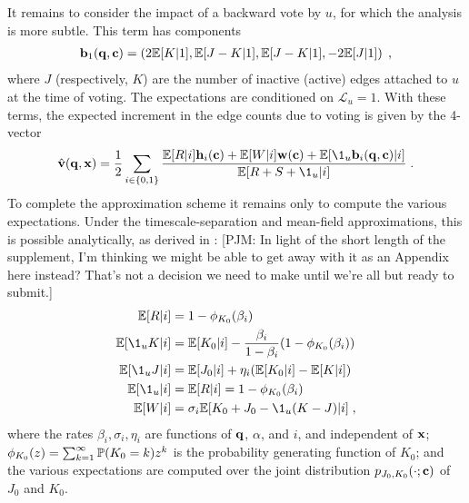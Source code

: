 \documentclass[review, onefignum, onetabnum]{siamart171218}
\newcommand{\pjm}[1]{{\color{blue}[PJM: #1]}}
\begin{document}
		It remains to consider the impact of a backward vote by $u$, for which the analysis is more subtle. 
		This term has components
		\begin{align}
			\mathbf{b}_1(\mathbf{q}, \mathbf{c}) = \left(2\mathbb{E}[K|1], \mathbb{E}[J-K|1], \mathbb{E}[J-K|1], -2\mathbb{E}[J|1]\right)\;,
		\end{align}
		where $J$ (respectively, $K$) are the number of inactive (active) edges attached to $u$ at the time of voting. 
		The expectations are conditioned on $\mathcal{L}_u = 1$.  
		With these terms, the expected increment in the edge counts due to voting is given by the 4-vector
		\begin{align}
			\hat{\mathbf{v}}(\q, \x) = \frac{1}{2} \sum_{i \in \{0,1\}} \frac{\E[R|i]\mathbf{h}_i(\C) + \E[W|i]\mathbf{w}(\C) + \E[\1_u\mathbf{b}_i(\mathbf{q},\mathbf{c})|i]}{\E[R + S + \1_u|i]}\;. \label{eq:v_hat}
		\end{align}
		To complete the approximation scheme it remains only to compute the various expectations. Under the timescale-separation and mean-field approximations, this is possible analytically, as derived in : \pjm{In light of the short length of the supplement, I'm thinking we might be able to get away with it as an Appendix here instead? That's not a decision we need to make until we're all but ready to submit.}   
		\begin{equation}
			\begin{aligned}
				\E[R|i] &= 1 - \phi_{K_0}(\beta_i) \\ 
				\E[\1_uK|i] &= \E[K_0|i] - \frac{\beta_i}{1-\beta_i}(1-\phi_{K_0}(\beta_i)) \\ 
				\E[\1_uJ|i] &= \E[J_0|i] + \eta_i(\E[K_0|i] - \E[K|i]) \\
				\E[\1_u|i] &= \E[R|i] = 1 - \phi_{K_0}(\beta_i) \\ 
				\E[W|i] &= \sigma_i\E[K_0 + J_0 - \1_u(K - J)|i]\;,	
			\end{aligned} \label{eq:component_approx}
		\end{equation}
		where the rates $\beta_i, \sigma_i, \eta_i$ are functions of $\mathbf{q}$, $\alpha$, and $i$, and independent of $\mathbf{x}$; $\phi_{K_0}(z) = \sum_{k = 1}^\infty \mathbb{P}(K_0 = k) z^{k}$ is the probability generating function of $K_0$; and the various expectations are computed over the joint distribution $p_{J_0, K_0}(\cdot;\mathbf{c})$ of $J_0$ and $K_0$. 
		  
\end{document}

